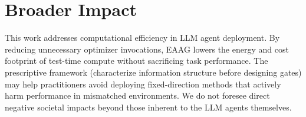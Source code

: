 \section{Broader Impact}
\label{app:impact}

This work addresses computational efficiency in LLM agent deployment.
By reducing unnecessary optimizer invocations, EAAG lowers the energy
and cost footprint of test-time compute without sacrificing task
performance. The prescriptive framework (characterize information
structure before designing gates) may help practitioners avoid
deploying fixed-direction methods that actively harm performance in
mismatched environments. We do not foresee direct negative societal
impacts beyond those inherent to the LLM agents themselves.
